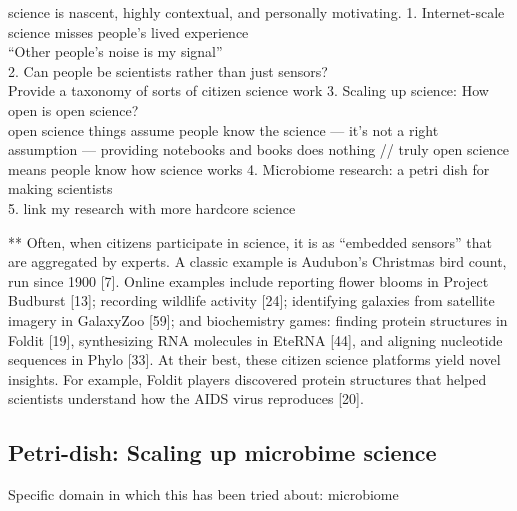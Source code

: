 science is nascent, highly contextual, and personally motivating.
1. Internet-scale science misses people’s lived experience \\
 “Other people’s noise is my signal” \\
2. Can people be scientists rather than just sensors? \\
 Provide a taxonomy of sorts of citizen science work
3. Scaling up science: How open is open science? \\
 open science things assume people know the science — it’s not a right assumption — providing notebooks and books does nothing // truly open science means people know how science works
4. Microbiome research: a petri dish for making scientists \\
5. link my research with more hardcore science

**
Often, when citizens participate in science, it is as “embedded sensors” that are aggregated by experts. A classic example is Audubon’s Christmas bird count, run since 1900
[7]. Online examples include reporting flower blooms in
Project Budburst [13]; recording wildlife activity [24];
identifying galaxies from satellite imagery in GalaxyZoo
[59]; and biochemistry games: finding protein structures in
Foldit [19], synthesizing RNA molecules in EteRNA [44], and aligning nucleotide sequences in Phylo [33]. At their
best, these citizen science platforms yield novel insights.
For example, Foldit players discovered protein structures
that helped scientists understand how the AIDS virus reproduces [20].


\subsection{Petri-dish: Scaling up microbime science}
Specific domain in which this has been tried about: microbiome

